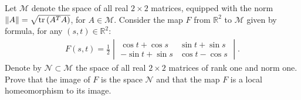 \documentclass[11pt]{article}
\theoremstyle{definition}
\numberwithin{equation}{subsection}
\begin{document}
Let $\mathcal{M}$ denote the space of all real $2 \times 2$ matrices, equipped with the norm $\|A\| = \sqrt{{\rm tr} \left(A^T A\right)}$, for $A \in \mathcal{M}$. Consider the map $F$ from $\mathbb{R}^2$ to $\mathcal{M}$ given by formula, for any $(s,t) \in \mathbb{R}^2$:
\begin{align*}
    F(s,t) = \frac{1}{2} 
    \begin{vmatrix}
        \cos t + \cos s & \sin t + \sin s \\
        - \sin t + \sin s & \cos t - \cos s
    \end{vmatrix}.
\end{align*}
Denote by $\mathcal{N} \subset \mathcal{M}$ the space of all real $2 \times 2$ matrices of rank one and norm one. Prove that the image of $F$ is the space $\mathcal{N}$ and that the map $F$ is a local homeomorphism to its image. 
\end{document}

